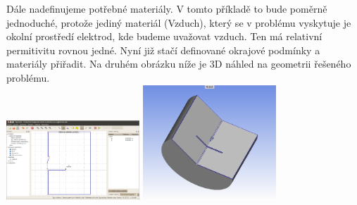 \documentclass[a4paper, oneside]{article}
\begin{document}
Dále nadefinujeme potřebné materiály. V tomto příkladě to bude poměrně jednoduché, protože jediný materiál (Vzduch), který se v problému vyskytuje je okolní prostředí elektrod, kde budeme uvažovat vzduch. Ten má relativní permitivitu rovnou jedné. Nyní již stačí definované okrajové podmínky a materiály přiřadit. Na druhém obrázku níže je 3D náhled na geometrii řešeného problému.\\
\includegraphics[width=5cm]{Geometrie_prvniho_problemu.eps}
\includegraphics[width=5cm]{Model.eps}\\
\end{document}
